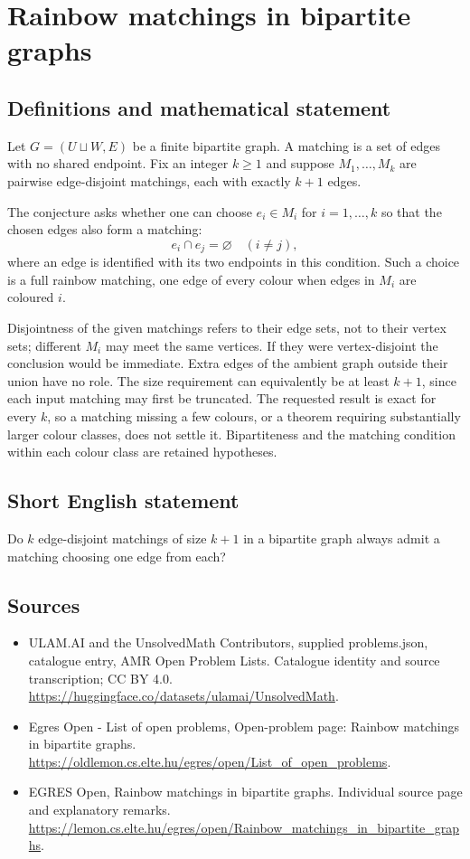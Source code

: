 \documentclass[11pt,a4paper]{article}
\begin{document}
\section*{Rainbow matchings in bipartite graphs}\label{statement}

\subsection{Definitions and mathematical statement}
Let $G=(U\sqcup W,E)$ be a finite bipartite graph. A matching is
a set of edges with no shared endpoint. Fix an integer $k\ge1$
and suppose $M_1,\ldots,M_k$ are pairwise edge-disjoint matchings,
each with exactly $k+1$ edges.

The conjecture asks whether one can choose $e_i\in M_i$ for
$i=1,\ldots,k$ so that the chosen edges also form a matching:
\[
                         e_i\cap e_j=\varnothing
                                           \quad(i\ne j),
\]
where an edge is identified with its two endpoints in this condition.
Such a choice is a full rainbow matching, one edge of every colour
when edges in $M_i$ are coloured $i$.

Disjointness of the given matchings refers to their edge sets, not
to their vertex sets; different $M_i$ may meet the same vertices.
If they were vertex-disjoint the conclusion would be immediate.
Extra edges of the ambient graph outside their union have no role.
The size requirement can equivalently be at least $k+1$, since
each input matching may first be truncated. The requested result
is exact for every $k$, so a matching missing a few colours, or a
theorem requiring substantially larger colour classes, does not
settle it. Bipartiteness and the matching condition within each
colour class are retained hypotheses.
\subsection{Short English statement}
Do $k$ edge-disjoint matchings of size $k+1$ in a bipartite graph
always admit a matching choosing one edge from each?
\subsection{Sources}
\begin{itemize}
\item[S1] ULAM.AI and the UnsolvedMath Contributors, supplied problems.json, catalogue entry, AMR Open Problem Lists. Catalogue identity and source transcription; CC BY 4.0.
\url{https://huggingface.co/datasets/ulamai/UnsolvedMath}.
\item[S2] Egres Open - List of open problems, Open-problem page: Rainbow matchings in bipartite graphs. 
\url{https://oldlemon.cs.elte.hu/egres/open/List_of_open_problems}.
\item[S3] EGRES Open, Rainbow matchings in bipartite graphs. Individual source page and explanatory remarks.
\url{https://lemon.cs.elte.hu/egres/open/Rainbow_matchings_in_bipartite_graphs}.
\end{itemize}
\end{document}
